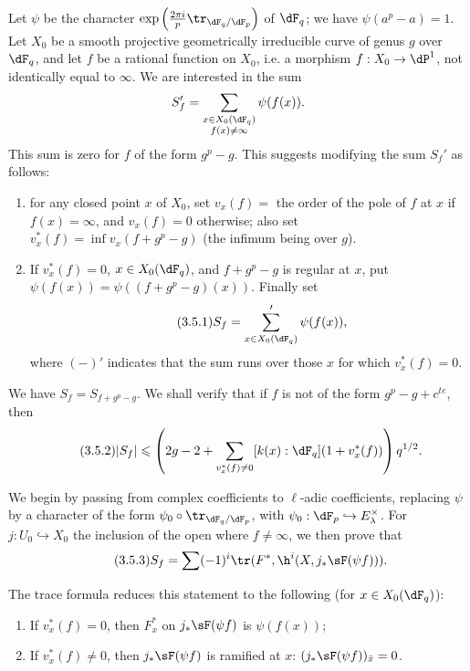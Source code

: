 \documentclass[oneside]{book}
\begin{document}
Let $\psi$ be the character 
$\exp\left(\frac{2\pi i}{p} \tr_{\dF_q/\dF_p}\right)$ of $\dF_q$; we have 
$\psi(a^p-a)=1$. Let $X_0$ be a smooth projective geometrically 
irreducible curve of genus $g$ over $\dF_q$, and let $f$ be a rational function on 
$X_0$, i.e. a morphism $f:X_0 \to \dP^1$, not identically equal to 
$\infty$. We are interested in the sum 
\[
  S_f' = \sum_{\substack{x\in X_0(\dF_q) \\ f(x)\ne \infty}} \psi(f(x)) 
  \text{.}
\]
This sum is zero for $f$ of the form $g^p-g$. This suggests modifying 
the sum $S_f'$ as follows: 
\begin{enumerate}[\indent a)]
  \item for any closed point $x$ of $X_0$, set $v_x(f) = $ the order of the 
    pole of $f$ at $x$ if $f(x)=\infty$, and $v_x(f)=0$ otherwise; also set 
    $v_x^\ast(f) = \inf v_x(f+g^p-g)$ (the infimum being over $g$). 
  \item If $v_x^\ast(f)=0$, $x\in X_0(\dF_q)$, and $f+g^p-g$ is 
    regular at $x$, put $\psi(f(x)) = \psi((f+g^p-g)(x))$. Finally set 
    \begin{equation*}\tag{3.5.1}\label{VI:eq:3-5-1}
      S_f = \sum'_{x\in X_0(\dF_q)} \psi(f(x)) \text{,}
    \end{equation*}
    where $(-)'$ indicates that the sum runs over those $x$ for which 
    $v_x^\ast(f)=0$. 
\end{enumerate}

We have $S_f=S_{f+g^p-g}$. We shall verify that if $f$ is not of the 
form $g^p-g+c^{t e}$, then 
\begin{equation*}\tag{3.5.2}\label{VI:eq:3-5-2}
  |S_f|\leqslant \left(2 g-2+\sum_{v_x^\ast(f)\ne 0} [k(x):\dF_q] (1+v_x^\ast(f))\right) q^{1/2} \text{.}
\end{equation*}

We begin by passing from complex coefficients to $\ell$-adic coefficients, replacing $\psi$ by 
a character of the form $\psi_0\circ \tr_{\dF_q/\dF_p}$, with 
$\psi_0:\dF_p\hookrightarrow E_\lambda^\times$. For $j:U_0\hookrightarrow X_0$ 
the inclusion of the open where $f\ne\infty$, we then prove that 
\begin{equation*}\tag{3.5.3}\label{VI:eq:3-5-3}
  S_f = \sum (-1)^i \tr(F^\ast,\h^i(X,j_\ast \sF(\psi f))) \text{.} 
\end{equation*}

The trace formula reduces this statement to the following (for 
$x\in X_0(\dF_q)$): 
\begin{enumerate}[\indent a)]
  \item If $v_x^\ast(f)=0$, then $F_x^\ast$ on $j_\ast \sF(\psi f)$ is 
    $\psi(f(x))$; 
  \item If $v_x^\ast(f)\ne 0$, then $j_\ast \sF(\psi f)$ is ramified at $x$: 
    $(j_\ast \sF(\psi f))_{\bar x}=0$. 
\end{enumerate}
\end{document}
